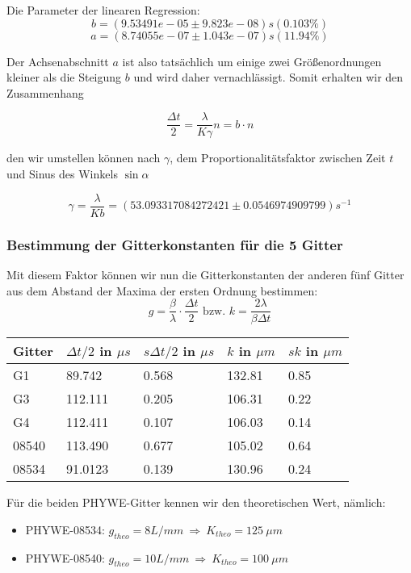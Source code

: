 Die Parameter der linearen Regression:
$$ b               = (9.53491e-05      \pm 9.823e-08) s    (0.103\%) $$
$$ a               = (8.74055e-07      \pm 1.043e-07) s    (11.94\%) $$

Der Achsenabschnitt $a$ ist also tatsächlich um einige zwei Größenordnungen kleiner als die Steigung $b$ und wird daher vernachlässigt. Somit erhalten wir den Zusammenhang

$$\frac{\Delta t}{2} = \frac{\lambda}{K\gamma}n = b\cdot n$$

den wir umstellen können nach $\gamma$, dem Proportionalitätsfaktor zwischen Zeit $t$ und Sinus des Winkels $\sin \alpha$ 

$$ \gamma = \frac{\lambda}{Kb} = (53.093317084272421 \pm 0.0546974909799) s^{-1} $$


\subsubsection{Bestimmung der Gitterkonstanten f\"ur die 5 Gitter}

Mit diesem Faktor können wir nun die Gitterkonstanten der anderen fünf Gitter aus dem Abstand der Maxima der ersten Ordnung bestimmen:
$$ g = \frac{\beta}{\lambda}\cdot \frac{\Delta t}{2} \text{ bzw. } k = \frac{2 \lambda }{\beta \Delta t} $$
\begin{center}
\begin{tabular}{lllll}
\toprule 
Gitter & $\Delta t /2$ in $\mu s$ & $s\Delta t /2$ in $\mu s$ & $k$ in $\mu m$ & $sk$ in $\mu m$\\
\midrule
G1 & 89.742 & 0.568 & 132.81 & 0.85\\
G3 & 112.111 & 0.205 & 106.31 & 0.22\\
G4 & 112.411 & 0.107 & 106.03 & 0.14\\
08540 & 113.490 & 0.677 & 105.02 & 0.64\\
08534 & 91.0123 & 0.139 & 130.96 & 0.24\\
\bottomrule
\end{tabular} 
\end{center}

F\"ur die beiden PHYWE-Gitter kennen wir den theoretischen Wert, n\"amlich: 
\begin{itemize}
\item PHYWE-08534: $g_{theo} = 8 L/mm\ \Rightarrow \ K_{theo} = 125 \ \mu m$
\item PHYWE-08540: $g_{theo} = 10 L/mm\ \Rightarrow \ K_{theo} = 100 \ \mu m$
\end{itemize} 

